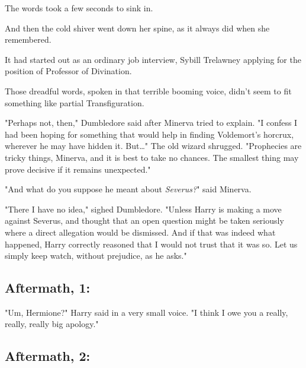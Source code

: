 The words took a few seconds to sink in.

And then the cold shiver went down her spine, as it always did when she 
remembered.

It had started out as an ordinary job interview, Sybill Trelawney applying for 
the position of Professor of Divination.


Those dreadful words, spoken in that terrible booming voice, didn't seem to fit 
something like partial Transfiguration.

"Perhaps not, then," Dumbledore said after Minerva tried to explain. "I confess 
I had been hoping for something that would help in finding Voldemort's horcrux, 
wherever he may have hidden it. But{\ldots}" The old wizard shrugged. 
"Prophecies are tricky things, Minerva, and it is best to take no chances. The 
smallest thing may prove decisive if it remains unexpected."

"And what do you suppose he meant about \emph{Severus?}" said Minerva.

"There I have no idea," sighed Dumbledore. "Unless Harry is making a move 
against Severus, and thought that an open question might be taken seriously 
where a direct allegation would be dismissed. And if that was indeed what 
happened, Harry correctly reasoned that I would not trust that it was so. Let 
us simply keep watch, without prejudice, as he asks."
\sbreak
\vspace{-2\baselineskip}
\subsection{Aftermath, 1:}

"Um, Hermione?" Harry said in a very small voice. "I think I owe you a really, 
really, really big apology."
\sbreak
\vspace{-2\baselineskip}
\subsection{Aftermath, 2:}

